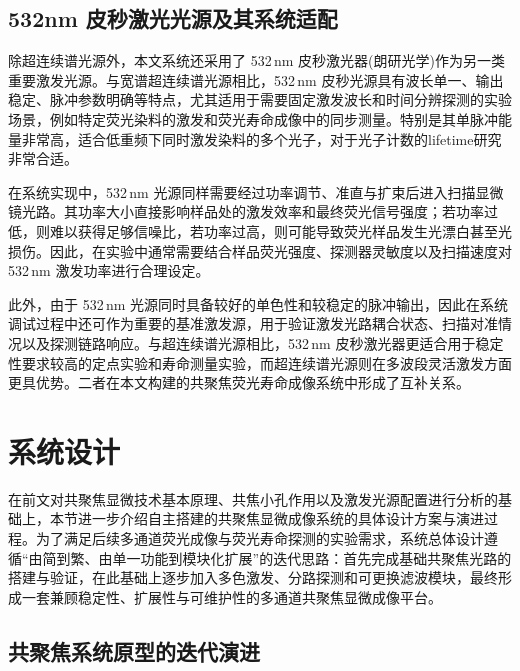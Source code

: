 

\subsection{532nm 皮秒激光光源及其系统适配}\label{3.2.2}

除超连续谱光源外，本文系统还采用了 532\,nm 皮秒激光器(朗研光学)作为另一类重要激发光源。与宽谱超连续谱光源相比，532\,nm 皮秒光源具有波长单一、输出稳定、脉冲参数明确等特点，尤其适用于需要固定激发波长和时间分辨探测的实验场景，例如特定荧光染料的激发和荧光寿命成像中的同步测量。特别是其单脉冲能量非常高，适合低重频下同时激发染料的多个光子，对于光子计数的lifetime研究非常合适。

在系统实现中，532\,nm 光源同样需要经过功率调节、准直与扩束后进入扫描显微镜光路。其功率大小直接影响样品处的激发效率和最终荧光信号强度；若功率过低，则难以获得足够信噪比，若功率过高，则可能导致荧光样品发生光漂白甚至光损伤。因此，在实验中通常需要结合样品荧光强度、探测器灵敏度以及扫描速度对 532\,nm 激发功率进行合理设定。

此外，由于 532\,nm 光源同时具备较好的单色性和较稳定的脉冲输出，因此在系统调试过程中还可作为重要的基准激发源，用于验证激发光路耦合状态、扫描对准情况以及探测链路响应。与超连续谱光源相比，532\,nm 皮秒激光器更适合用于稳定性要求较高的定点实验和寿命测量实验，而超连续谱光源则在多波段灵活激发方面更具优势。二者在本文构建的共聚焦荧光寿命成像系统中形成了互补关系。



\section{系统设计}\label{3.3}

在前文对共聚焦显微技术基本原理、共焦小孔作用以及激发光源配置进行分析的基础上，本节进一步介绍自主搭建的共聚焦显微成像系统的具体设计方案与演进过程。为了满足后续多通道荧光成像与荧光寿命探测的实验需求，系统总体设计遵循``由简到繁、由单一功能到模块化扩展''的迭代思路：首先完成基础共聚焦光路的搭建与验证，在此基础上逐步加入多色激发、分路探测和可更换滤波模块，最终形成一套兼顾稳定性、扩展性与可维护性的多通道共聚焦显微成像平台。



\subsection{共聚焦系统原型的迭代演进}


